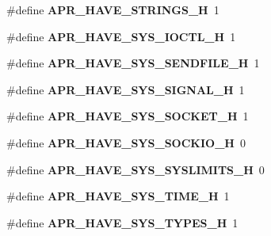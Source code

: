 \begin{DoxyCompactItemize}
\item 
\#define {\bfseries A\+P\+R\+\_\+\+H\+A\+V\+E\+\_\+\+S\+T\+R\+I\+N\+G\+S\+\_\+H}~1\hypertarget{group__apr__platform_ga9c3381ac9d13a54181f0f0db44edb9da}{}\label{group__apr__platform_ga9c3381ac9d13a54181f0f0db44edb9da}

\item 
\#define {\bfseries A\+P\+R\+\_\+\+H\+A\+V\+E\+\_\+\+S\+Y\+S\+\_\+\+I\+O\+C\+T\+L\+\_\+H}~1\hypertarget{group__apr__platform_gaa770dc014bd3652af53e0b5007bacbba}{}\label{group__apr__platform_gaa770dc014bd3652af53e0b5007bacbba}

\item 
\#define {\bfseries A\+P\+R\+\_\+\+H\+A\+V\+E\+\_\+\+S\+Y\+S\+\_\+\+S\+E\+N\+D\+F\+I\+L\+E\+\_\+H}~1\hypertarget{group__apr__platform_gadad28590d1ed5f6417d364da8d224c32}{}\label{group__apr__platform_gadad28590d1ed5f6417d364da8d224c32}

\item 
\#define {\bfseries A\+P\+R\+\_\+\+H\+A\+V\+E\+\_\+\+S\+Y\+S\+\_\+\+S\+I\+G\+N\+A\+L\+\_\+H}~1\hypertarget{group__apr__platform_ga8fcdcf3453badd12e7690ef1d3633524}{}\label{group__apr__platform_ga8fcdcf3453badd12e7690ef1d3633524}

\item 
\#define {\bfseries A\+P\+R\+\_\+\+H\+A\+V\+E\+\_\+\+S\+Y\+S\+\_\+\+S\+O\+C\+K\+E\+T\+\_\+H}~1\hypertarget{group__apr__platform_ga355cce8fb6a675d1608a249e80943cd1}{}\label{group__apr__platform_ga355cce8fb6a675d1608a249e80943cd1}

\item 
\#define {\bfseries A\+P\+R\+\_\+\+H\+A\+V\+E\+\_\+\+S\+Y\+S\+\_\+\+S\+O\+C\+K\+I\+O\+\_\+H}~0\hypertarget{group__apr__platform_ga66930e9c37ff249fac4f04660e0b4658}{}\label{group__apr__platform_ga66930e9c37ff249fac4f04660e0b4658}

\item 
\#define {\bfseries A\+P\+R\+\_\+\+H\+A\+V\+E\+\_\+\+S\+Y\+S\+\_\+\+S\+Y\+S\+L\+I\+M\+I\+T\+S\+\_\+H}~0\hypertarget{group__apr__platform_ga5f63518e601ff8db2435aac44aa1f5f1}{}\label{group__apr__platform_ga5f63518e601ff8db2435aac44aa1f5f1}

\item 
\#define {\bfseries A\+P\+R\+\_\+\+H\+A\+V\+E\+\_\+\+S\+Y\+S\+\_\+\+T\+I\+M\+E\+\_\+H}~1\hypertarget{group__apr__platform_ga9c3c283b26dc4a611e0e90586940d988}{}\label{group__apr__platform_ga9c3c283b26dc4a611e0e90586940d988}

\item 
\#define {\bfseries A\+P\+R\+\_\+\+H\+A\+V\+E\+\_\+\+S\+Y\+S\+\_\+\+T\+Y\+P\+E\+S\+\_\+H}~1\hypertarget{group__apr__platform_gad364bcfd0d4403388881ae74f30ae870}{}\label{group__apr__platform_gad364bcfd0d4403388881ae74f30ae870}


\end{DoxyCompactItemize}
